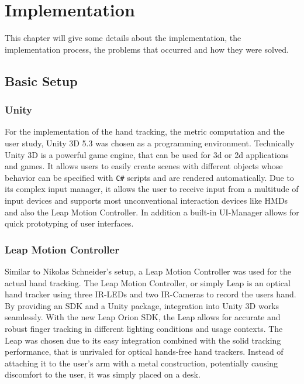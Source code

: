 \chapter{Implementation}\label{chapter:implementation}

This chapter will give some details about the implementation, the implementation process, the problems that occurred and how they were solved.

\section{Basic Setup}

\subsection{Unity}

For the implementation of the hand tracking, the metric computation and the user study, Unity 3D 5.3 was chosen as a programming environment. Technically Unity 3D is a powerful game engine, that can be used for 3d or 2d applications and games. It allows users to easily create scenes with different objects whose behavior can be specified with \texttt{C\#} scripts and are rendered automatically. Due to its complex input manager, it allows the user to receive input from a multitude of input devices and supports most unconventional interaction devices like HMDs and also the Leap Motion Controller. In addition a built-in UI-Manager allows for quick prototyping of user interfaces. 

\subsection{Leap Motion Controller}

Similar to Nikolas Schneider's setup, a Leap Motion Controller was used for the actual hand tracking. The Leap Motion Controller, or simply Leap is an optical hand tracker using three IR-LEDs and two IR-Cameras to record the users hand. By providing an SDK and a Unity package, integration into Unity 3D works seamlessly. With the new Leap Orion SDK, the Leap allows for accurate and robust finger tracking in different lighting conditions and usage contexts. The Leap was chosen due to its easy integration combined with the solid tracking performance, that is unrivaled for optical hands-free hand trackers.  
Instead of attaching it to the user's arm with a metal construction, potentially causing discomfort to the user, it was simply placed on a desk. 

